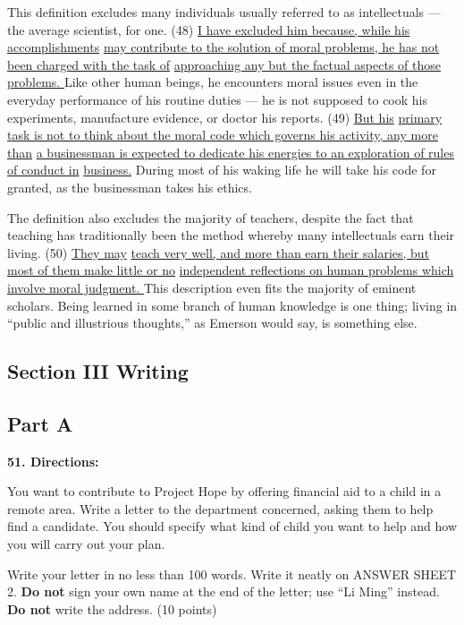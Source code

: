 \documentclass[UTF8,11pt]{ctexart}
\begin{document}
This definition excludes many individuals usually referred to as intellectuals — the average scientist, for one. (48) \uline{I have excluded him because, while his accomplishments} \uline{may contribute to the solution of moral problems, he has not been charged with the task of} \uline{approaching any but the factual aspects of those problems. }Like other human beings, he encounters moral issues even in the everyday performance of his routine duties — he is not supposed to cook his experiments, manufacture evidence, or doctor his reports. (49) \uline{But his} \uline{primary task is not to think about the moral code which governs his activity, any more than} \uline{a businessman is expected to dedicate his energies to an exploration of rules of conduct in} \uline{business.} During most of his waking life he will take his code for granted, as the businessman takes his ethics.


The definition also excludes the majority of teachers, despite the fact that teaching has traditionally been the method whereby many intellectuals earn their living. (50) \uline{They may} \uline{teach very well, and more than earn their salaries, but most of them make little or no} \uline{independent reflections on human problems which involve moral judgment. }This description even fits the majority of eminent scholars. Being learned in some branch of human knowledge is one thing; living in “public and illustrious thoughts,” as Emerson would say, is something else.


\subsection*{\textbf{Section III Writing}}


\subsection*{\textbf{Part A}}


\textbf{51. Directions:}


You want to contribute to Project Hope by offering financial aid to a child in a remote area. Write a letter to the department concerned, asking them to help find a candidate. You should specify what kind of child you want to help and how you will carry out your plan.


Write your letter in no less than 100 words. Write it neatly on ANSWER SHEET 2. \textbf{Do not} sign your own name at the end of the letter; use “Li Ming” instead. \textbf{Do not} write the address. (10 points)
\end{document}
